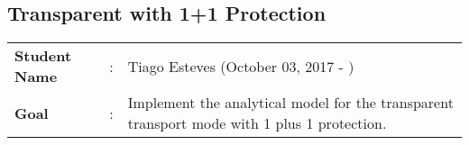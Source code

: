 \clearpage

\subsection{Transparent with 1+1 Protection}\label{analytical_Transp_Protection}
\begin{tcolorbox}	
\begin{tabular}{p{2.75cm} p{0.2cm} p{10.5cm}} 	
\textbf{Student Name}  &:& Tiago Esteves    (October 03, 2017 - )\\
\textbf{Goal}          &:& Implement the analytical model for the transparent transport mode with 1 plus 1 protection.
\end{tabular}
\end{tcolorbox}
\vspace{11pt}

